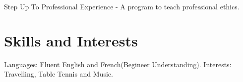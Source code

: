 \documentclass{Mihir_Kavatkar-Resume}
\begin{document}
			\vspace*{-0.5em}
			\workitemsAdditional
			{Step Up To Professional Experience - A program to teach professional ethics.}
		\fi
		
	\section{Skills and Interests}
		\workitems
		{Languages: Fluent English and French(Begineer Understanding).}
		{Interests: Travelling, Table Tennis and Music.}	
		
		
		
		
\end{document}
